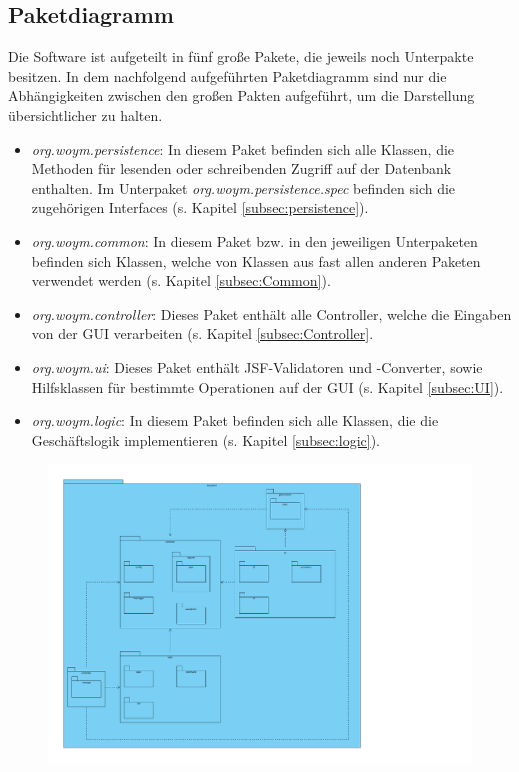 \documentclass[fontsize=12pt,paper=a4,twoside]{scrartcl}
\begin{document}
\subsection{Paketdiagramm}
Die Software ist aufgeteilt in fünf große Pakete, die jeweils noch Unterpakte besitzen. In dem nachfolgend aufgeführten Paketdiagramm sind nur die Abhängigkeiten zwischen den großen Pakten aufgeführt, um die Darstellung übersichtlicher zu halten.\\

\begin{itemize}
\item \textit{org.woym.persistence}: In diesem Paket befinden sich alle Klassen, die Methoden für lesenden oder schreibenden Zugriff auf der Datenbank enthalten. Im Unterpaket \textit{org.woym.persistence.spec} befinden sich die zugehörigen Interfaces (s. Kapitel \ref{subsec:persistence}).
\item \textit{org.woym.common}: In diesem Paket  bzw. in den jeweiligen Unterpaketen befinden sich Klassen, welche von Klassen aus fast allen anderen Paketen verwendet werden (s. Kapitel \ref{subsec:Common}). 
\item \textit{org.woym.controller}: Dieses Paket enthält alle Controller, welche die Eingaben von der GUI verarbeiten (s. Kapitel \ref{subsec:Controller}.
\item \textit{org.woym.ui}: Dieses Paket enthält JSF-Validatoren und -Converter, sowie Hilfsklassen für bestimmte Operationen auf der GUI (s. Kapitel \ref{subsec:UI}).
\item \textit{org.woym.logic}: In diesem Paket befinden sich alle Klassen, die die Geschäftslogik implementieren (s. Kapitel \ref{subsec:logic}).
\end{itemize}
 


\begin{figure}[H]
\includegraphics[width=\textwidth]{packages.pdf}
\end{figure}
\end{document}
